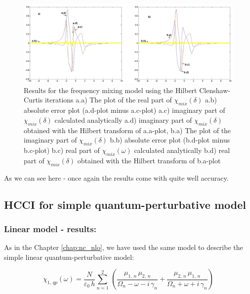 \documentclass[12pt,twoside,a4paper]{article}
\numberwithin{equation}{subsection}
\numberwithin{figure}{subsection}
\begin{document}
\begin{figure} 
  \includegraphics[width=150mm]{img/hcc_fmix.png}
  \caption{Results for the frequency mixing model using the Hilbert Clenshaw-Curtis iterations
     a.a) The plot of the real part of ${\chi_{mix}}(\delta )$
     a.b) absolute error plot (a.d-plot minus a.c-plot) 
     a.c) imaginary part of ${\chi_{mix}}(\delta )$ calculated analytically 
     a.d) imaginary part of ${\chi_{mix}}(\delta )$ obtained with the Hilbert transform of a.a-plot, 
     b.a) The plot of the imaginary part of ${\chi_{mix}}(\delta )$ 
     b.b) absolute error plot (b.d-plot minus b.c-plot) 
     b.c) real part of $\chi_{mix} (\omega )$ calculated analytically 
     b.d) real part of ${\chi_{mix}}(\delta )$ obtained with the Hilbert transform of b.a-plot 
     \label{fig:hcci_fmix}
     }
\end{figure}

As we can see here - once again the results come with quite well accuracy.

\subsection{HCCI for simple quantum-perturbative model} \label{chap:hcc_quantum}
 
\subsubsection*{Linear model - results:}

As in the Chapter \ref{chap:nc_nlo}, we have used the same model to describe the simple linear quantum-perturbative model: 

\begin{equation} \label{eq:hcc_qp}
  {\chi_{1, \,qp}}(\omega ) = \frac {N}{\varepsilon_0\,h} \sum_{n=1}^{2}\,(\frac {{\mu_{1, \,n}}\,{ \mu_{2, \,n}}}{{\Omega_{n}}
  - \omega  - i\,{\gamma_{n}}} + \frac {{\mu_{2, \,n}}\,{\mu_{1, \,n}}}{{\Omega_{n}} + \omega + i\,{\gamma_{n}}})
\end{equation}
\end{document}
